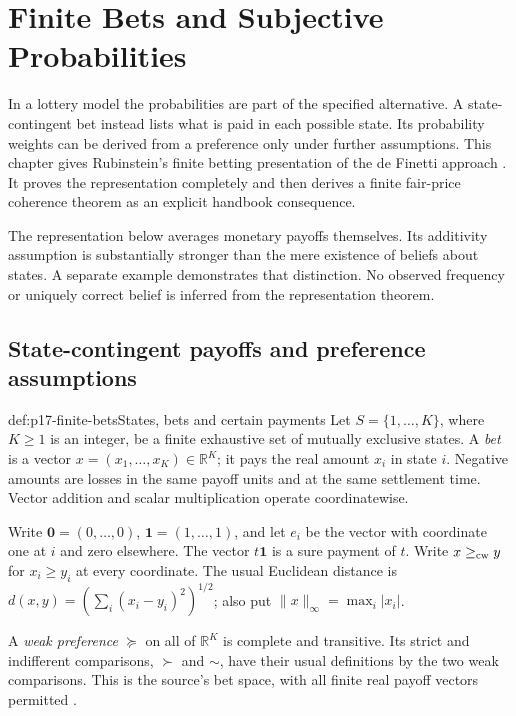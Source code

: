 \chapter{Finite Bets and Subjective Probabilities}
\label{sec:p17-finite-subjective-probability}

In a lottery model the probabilities are part of the specified
alternative. A state-contingent bet instead lists what is paid in each
possible state. Its probability weights can be derived from a preference
only under further assumptions. This chapter gives Rubinstein's finite
betting presentation of the de Finetti approach
\cite[2015 revision, pp.~102--103]{Rubinstein2015LectureNotes}.
It proves the representation completely and then derives a finite
fair-price coherence theorem as an explicit handbook consequence.

The representation below averages monetary payoffs themselves. Its
additivity assumption is substantially stronger than the mere existence
of beliefs about states. A separate example demonstrates that distinction.
No observed frequency or uniquely correct belief is inferred from the
representation theorem.

\section{State-contingent payoffs and preference assumptions}
\label{sec:p17-finite-bet-domain}

\begin{hbdefinition}{def:p17-finite-bets}{States, bets and certain payments}
Let \(S=\{1,\ldots,K\}\), where \(K\geq1\) is an integer, be a
finite exhaustive set of mutually exclusive states. A \emph{bet} is a
vector \(x=(x_1,\ldots,x_K)\in\mathbb R^K\); it pays the real amount
\(x_i\) in state \(i\). Negative amounts are losses in the same
payoff units and at the same settlement time.
Vector addition and scalar multiplication operate coordinatewise.

Write \(\mathbf0=(0,\ldots,0)\), \(\mathbf1=(1,\ldots,1)\),
and let \(e_i\) be the vector with coordinate one at \(i\) and zero
elsewhere. The vector \(t\mathbf1\) is a sure payment of \(t\).
Write \(x\geq_{\rm cw}y\) for \(x_i\geq y_i\) at every coordinate.
The usual Euclidean distance is
\(d(x,y)=(\sum_i(x_i-y_i)^2)^{1/2}\); also put
\(\|x\|_\infty=\max_i|x_i|\).

A \emph{weak preference} \(\succeq\) on all of \(\mathbb R^K\)
is complete and transitive. Its strict and indifferent comparisons,
\(\succ\) and \(\sim\), have their usual definitions by the two
weak comparisons. This is the source's bet space, with all finite
real payoff vectors permitted \cite[p.~102]{Rubinstein2015LectureNotes}.
\end{hbdefinition}

